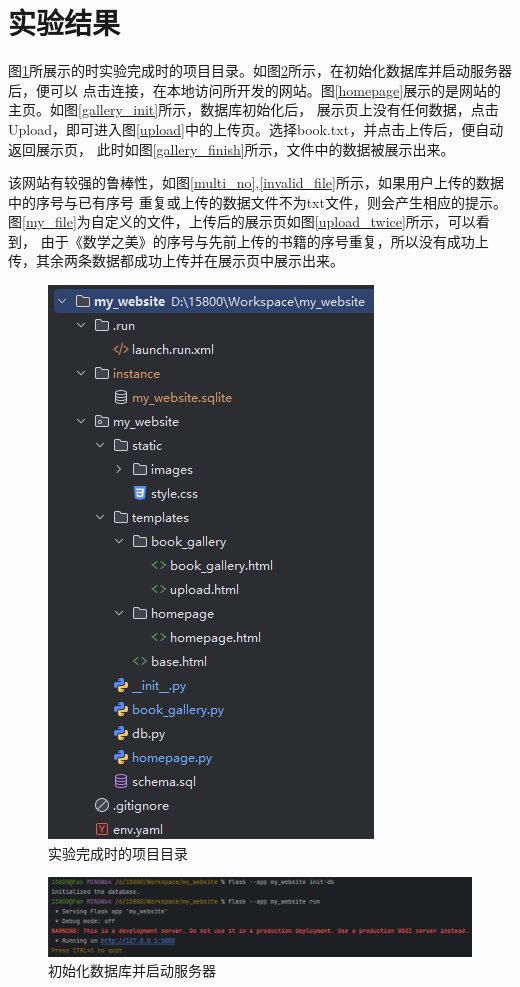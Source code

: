\section{实验结果}
图\ref{tree}所展示的时实验完成时的项目目录。如图\ref{init}所示，在初始化数据库并启动服务器后，便可以
点击连接，在本地访问所开发的网站。图\ref{homepage}展示的是网站的主页。如图\ref{gallery_init}所示，数据库初始化后，
展示页上没有任何数据，点击Upload，即可进入图\ref{upload}中的上传页。选择book.txt，并点击上传后，便自动返回展示页，
此时如图\ref{gallery_finish}所示，文件中的数据被展示出来。

该网站有较强的鲁棒性，如图\ref{multi_no},\ref{invalid_file}所示，如果用户上传的数据中的序号与已有序号
重复或上传的数据文件不为txt文件，则会产生相应的提示。图\ref{my_file}为自定义的文件，上传后的展示页如图\ref{upload_twice}所示，可以看到，
由于《数学之美》的序号与先前上传的书籍的序号重复，所以没有成功上传，其余两条数据都成功上传并在展示页中展示出来。
\begin{figure}[!htbp]
    \centering
    \includegraphics[scale=1]{figures/tree.png}
    \caption{实验完成时的项目目录}\label{tree}
\end{figure}
\begin{figure}[!htbp]
    \centering
    \includegraphics[width=\textwidth]{figures/init.png}
    \caption{初始化数据库并启动服务器}\label{init}
\end{figure}
